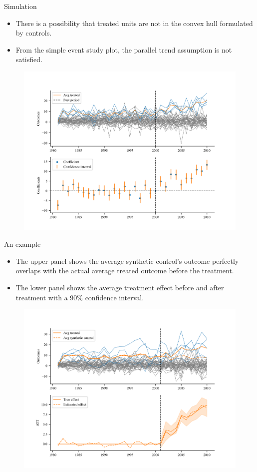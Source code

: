 \documentclass{beamer}
\begin{document}
\begin{frame}{Simulation}
\begin{itemize}
    \item There is a possibility that treated units are not in the convex hull formulated by controls.
    \item From the simple event study plot, the parallel trend assumption is not satisfied.
\end{itemize}
\begin{figure}
    \centering
    \includegraphics[scale=0.5]{figs/data_plot.png}
\end{figure}
\end{frame}

\begin{frame}{An example}
\begin{itemize}
    \item The upper panel shows the average synthetic control's outcome perfectly overlaps with the actual average treated outcome before the treatment.
    \item The lower panel shows the average treatment effect before and after treatment with a 90\% confidence interval.
\end{itemize}
\begin{figure}
    \centering
    \includegraphics[scale=0.5]{figs/estimation.png}
\end{figure}
\end{frame}
\end{document}
